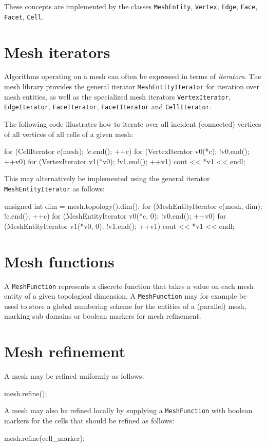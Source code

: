 These concepts are implemented by the classes
\texttt{MeshEntity},
\texttt{Vertex},
\texttt{Edge},
\texttt{Face},
\texttt{Facet},
\texttt{Cell}.

\section{Mesh iterators}

Algorithms operating on a mesh
can often be expressed in terms of
\emph{iterators}. The mesh library provides the general iterator
\texttt{MeshEntityIterator} for iteration over mesh entities, as well
as the specialized mesh iterators
\texttt{VertexIterator},
\texttt{EdgeIterator},
\texttt{FaceIterator},
\texttt{FacetIterator} and
\texttt{Cell\-Iterator}.

The following code illustrates how to iterate over all incident
(connected) vertices of all vertices of all cells of a given mesh:
\begin{code}
for (CellIterator c(mesh); !c.end(); ++c)
  for (VertexIterator v0(*c); !v0.end(); ++v0)
    for (VertexIterator v1(*v0); !v1.end(); ++v1)
      cout << *v1 << endl;
\end{code}
This may alternatively be implemented using the general iterator
\texttt{MeshEntity\-Iterator} as follows:
\begin{code}
unsigned int dim = mesh.topology().dim();
for (MeshEntityIterator c(mesh, dim); !c.end(); ++c)
  for (MeshEntityIterator v0(*c, 0); !v0.end(); ++v0)
    for (MeshEntityIterator v1(*v0, 0); !v1.end(); ++v1)
      cout << *v1 << endl;
\end{code}

\section{Mesh functions}

A \texttt{MeshFunction} represents a discrete function that takes a
value on each mesh entity of a given topological dimension.
A \texttt{MeshFunction} may for example be used to store a global
numbering scheme for the entities of a (parallel) mesh, marking
sub domains or boolean markers for mesh refinement.

\section{Mesh refinement}

A mesh may be refined uniformly as follows:
\begin{code}
mesh.refine();
\end{code}
A mesh may also be refined locally by supplying a
\texttt{MeshFunction} with boolean markers for the cells that should
be refined as follows:
\begin{code}
mesh.refine(cell_marker);
\end{code}

